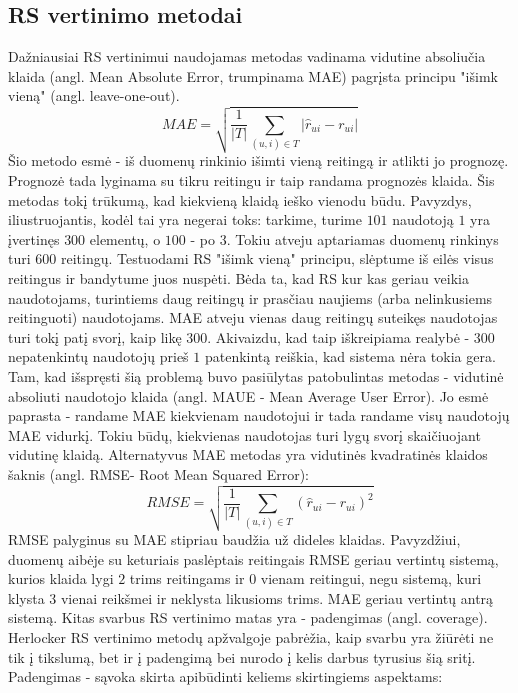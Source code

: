 \documentclass{VUMIFInfMagistrinis}
\begin{document}
\subsection{RS vertinimo metodai}
Dažniausiai RS vertinimui naudojamas metodas vadinama vidutine absoliučia klaida (angl. Mean Absolute Error, trumpinama MAE) pagrįsta principu "išimk vieną" (angl. leave-one-out). 
\begin{equation}
MAE = \sqrt{\frac{1}{|T|}\sum\limits_{(u,i)\in T} |\hat{r}_{ui} - r_{ui}|}
\end{equation}
Šio metodo esmė - iš duomenų rinkinio išimti vieną reitingą ir atlikti jo prognozę. Prognozė tada lyginama su tikru reitingu ir taip randama prognozės klaida. Šis metodas tokį trūkumą, kad kiekvieną klaidą ieško vienodu būdu. Pavyzdys, iliustruojantis, kodėl tai yra negerai toks: tarkime, turime $101$ naudotoją $1$ yra įvertinęs $300$ elementų, o $100$ - po $3$. Tokiu atveju aptariamas duomenų rinkinys turi $600$ reitingų. Testuodami RS "išimk vieną" principu, slėptume iš eilės visus reitingus ir bandytume juos nuspėti. Bėda ta, kad RS kur kas geriau veikia naudotojams, turintiems daug reitingų ir prasčiau naujiems (arba nelinkusiems reitinguoti) naudotojams. MAE atveju vienas daug reitingų suteikęs naudotojas turi tokį patį svorį, kaip likę $300$. Akivaizdu, kad taip iškreipiama realybė - $300$ nepatenkintų naudotojų prieš $1$ patenkintą reiškia, kad sistema nėra tokia gera. Tam, kad išspręsti šią problemą buvo pasiūlytas patobulintas metodas - vidutinė absoliuti naudotojo klaida (angl. MAUE - Mean Average User Error). Jo esmė paprasta - randame MAE kiekvienam naudotojui ir tada randame visų naudotojų MAE vidurkį. Tokiu būdų, kiekvienas naudotojas turi lygų svorį skaičiuojant vidutinę klaidą.
\newline
\indent
Alternatyvus MAE metodas yra vidutinės kvadratinės klaidos šaknis (angl. RMSE- Root Mean Squared Error):
\begin{equation}
RMSE = \sqrt{\frac{1}{|T|}\sum\limits_{(u,i)\in T} (\hat{r}_{ui} - r_{ui})^2}
\end{equation}
RMSE palyginus su MAE stipriau baudžia už dideles klaidas. Pavyzdžiui, duomenų aibėje su keturiais paslėptais reitingais RMSE geriau vertintų sistemą, kurios klaida lygi $2$ trims reitingams ir $0$ vienam reitingui, negu sistemą, kuri klysta $3$ vienai reikšmei ir neklysta likusioms trims. MAE geriau vertintų antrą sistemą.
\newline
\indent
Kitas svarbus RS vertinimo matas yra - padengimas (angl. coverage). Herlocker RS vertinimo metodų apžvalgoje pabrėžia, kaip svarbu yra žiūrėti ne tik į tikslumą, bet ir į padengimą bei nurodo į kelis darbus tyrusius šią sritį. Padengimas - sąvoka skirta apibūdinti keliems skirtingiems aspektams:
\end{document}
